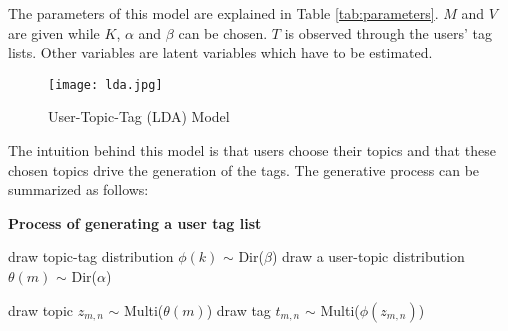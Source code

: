 The parameters of this model are explained in Table \ref{tab:parameters}.
$M$ and $V$ are given while $K$, $\alpha$ and $\beta$ can be chosen. $T$ is observed through the users' tag lists. Other variables are latent variables which have to be estimated.

\begin{figure}[htbp]\centering
\texttt{[image: lda.jpg]}  %
\caption{User-Topic-Tag (LDA) Model}
\label{fig:lda}
\end{figure}

The intuition behind this model is that users choose their topics and that these chosen topics drive the generation of the tags.
The generative process can be summarized as follows:

\begin{algorithm}%
\begin{algorithmic}[1]
\label{algo:algoldagenerateprocess}
\State \textbf{Process of generating a user tag list} 

\State draw topic-tag distribution $\phi(k)$ $\sim$ Dir($\beta$)
\EndFor
{}
\State draw a user-topic distribution $\theta(m)$ $\sim$ Dir($\alpha$)
\EndFor
{}

\State draw topic $z_{m,n}$  $\sim$ Multi($\theta(m)$)
\State draw tag $t_{m,n}$ $\sim$ Multi($\phi(z_{m,n})$)

\EndFor
\end{algorithmic}
\end{algorithm}




